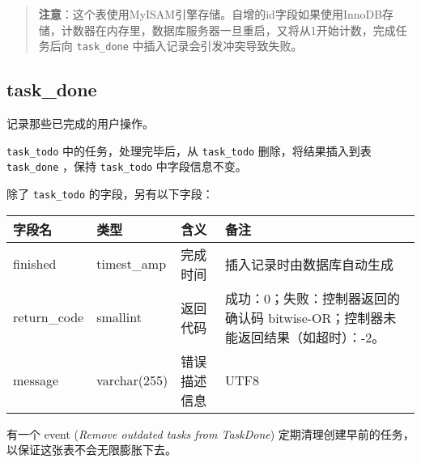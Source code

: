 \begin{quote}
\textbf{注意}：这个表使用MyISAM引擎存储。自增的id字段如果使用InnoDB存储，计数器在内存里，数据库服务器一旦重启，又将从1开始计数，完成任务后向
\texttt{task\_done} 中插入记录会引发冲突导致失败。
\end{quote}

\subsection{task\_done}\label{taskux5fdone}

记录那些已完成的用户操作。

\texttt{task\_todo} 中的任务，处理完毕后，从 \texttt{task\_todo}
删除，将结果插入到表 \texttt{task\_done} ，保持 \texttt{task\_todo}
中字段信息不变。

除了 \texttt{task\_todo} 的字段，另有以下字段：

\begin{longtabu}[c]{@{}lXXX@{}}
\toprule
字段名 & 类型 & 含义 & 备注\tabularnewline
\midrule
\endhead
finished & timest\_amp & 完成时间 &
插入记录时由数据库自动生成\tabularnewline
return\_code & smallint & 返回代码 & 成功：0；失败：控制器返回的确认码
bitwise-OR；控制器未能返回结果（如超时）：-2。\tabularnewline
message & varchar(255) & 错误描述信息 & UTF8\tabularnewline
\bottomrule
\end{longtabu}

有一个 event (\emph{Remove outdated tasks from TaskDone})
定期清理创建早前的任务，以保证这张表不会无限膨胀下去。
